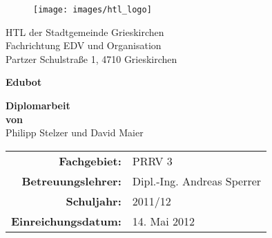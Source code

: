 
\begin{titlepage}

	\begin{figure}[H]
	\hspace{10cm}
		\texttt{[image: images/htl\_logo]}
	\end{figure}
	\vspace*{3cm}
	
	\begin{center}
		\Huge
		HTL der Stadtgemeinde Grieskirchen\\
		\vspace{0.5cm}
		\Large
		Fachrichtung EDV und Organisation\\
		\vspace{0.5cm}
		\large
		Partzer Schulstraße 1, 4710 Grieskirchen
		\vspace{2cm}	
			
		\Huge
		\textbf{Edubot}\\
		\vspace{1cm}
		
		\large
		\textbf{Diplomarbeit}\\
		\textbf{von}\\
		\vspace{1em}
		Philipp Stelzer und David Maier\\
		\vspace{4cm}
		\normalsize
	\end{center}
	
	\hspace{2.85cm}
	\begin{tabular}{rl}
		\textbf{Fachgebiet:}   & PRRV 3\\
		\textbf{Betreuungslehrer:}   & Dipl.-Ing. Andreas Sperrer\\
		\textbf{Schuljahr:}   & 2011/12\\
		\textbf{Einreichungsdatum:}   & 14. Mai 2012\\
	\end{tabular}
	
	\normalsize
\end{titlepage}

%
%
